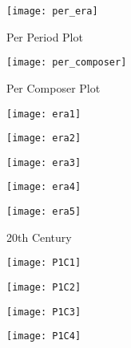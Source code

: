 \begin{figure}[!htb]
\caption{Per Period Plot}
\centering
\texttt{[image: per\_era]}
\end{figure}

\begin{figure}[!htb]
\caption{Per Composer Plot}
\centering
\texttt{[image: per\_composer]}
\end{figure}

\begin{figure}
\centering
\begin{minipage}{.5\textwidth}
  \centering
  \texttt{[image: era1]}
  \label{fig:test1}
\end{minipage}%
\begin{minipage}{.5\textwidth}
  \centering
  \texttt{[image: era2]}
  \label{fig:test2}
\end{minipage}
\end{figure}

\begin{figure}
\centering
\begin{minipage}{.5\textwidth}
  \centering
  \texttt{[image: era3]}
  \label{fig:test1}
\end{minipage}%
\begin{minipage}{.5\textwidth}
  \centering
  \texttt{[image: era4]}
  \label{fig:test2}
\end{minipage}
\end{figure}

\begin{figure}[h]
\caption{20th Century}
\centering
\texttt{[image: era5]}
\end{figure}

\begin{figure}
\centering
\begin{minipage}{.5\textwidth}
  \centering
  \texttt{[image: P1C1]}
  \label{fig:test1}
\end{minipage}%
\begin{minipage}{.5\textwidth}
  \centering
  \texttt{[image: P1C2]}
  \label{fig:test2}
\end{minipage}
\end{figure}

\begin{figure}
\centering
\begin{minipage}{.5\textwidth}
  \centering
  \texttt{[image: P1C3]}
  \label{fig:test1}
\end{minipage}%
\begin{minipage}{.5\textwidth}
  \centering
  \texttt{[image: P1C4]}
  \label{fig:test2}
\end{minipage}
\end{figure}

